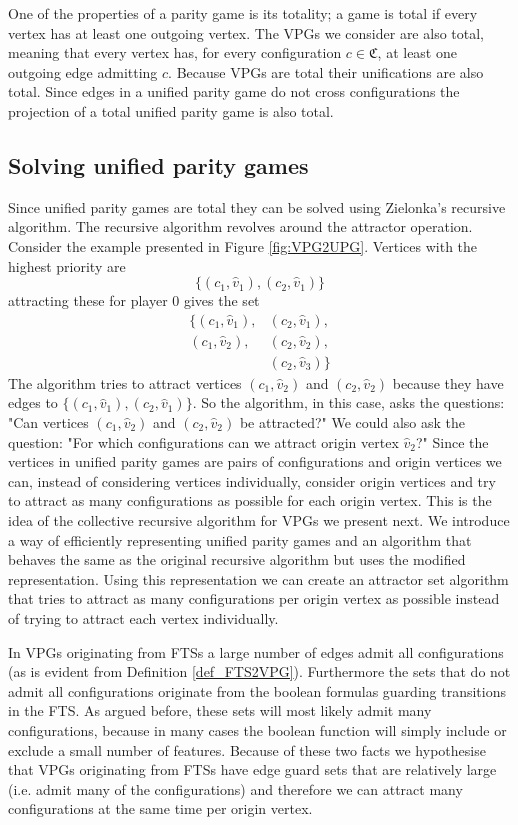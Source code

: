 One of the properties of a parity game is its totality; a game is total if every vertex has at least one outgoing vertex. The VPGs we consider are also total, meaning that every vertex has, for every configuration $c \in \mathfrak{C}$, at least one outgoing edge admitting $c$. Because VPGs are total their unifications are also total. Since edges in a unified parity game do not cross configurations the projection of a total unified parity game is also total.

\subsection{Solving unified parity games}
Since unified parity games are total they can be solved using Zielonka's recursive algorithm. The recursive algorithm revolves around the attractor operation. Consider the example presented in Figure \ref{fig:VPG2UPG}. Vertices with the highest priority are 
\[ \{(c_1,\hat{v}_1),(c_2,\hat{v}_1)\}\]
attracting these for player $0$ gives the set 
\begin{align*}
\{(c_1,\hat{v}_1),&(c_2,\hat{v}_1),\\
(c_1,\hat{v}_2),&(c_2,\hat{v}_2),\\
 &(c_2,\hat{v}_3)\}
\end{align*}
The algorithm tries to attract vertices $(c_1,\hat{v}_2)$ and $(c_2,\hat{v}_2)$ because they have edges to $\{(c_1,\hat{v}_1), (c_2,\hat{v}_1)\}$. So the algorithm, in this case, asks the questions: "Can vertices $(c_1,\hat{v}_2)$ and $(c_2,\hat{v}_2)$ be attracted?" We could also ask the question: "For which configurations can we attract origin vertex $\hat{v}_2$?" Since the vertices in unified parity games are pairs of configurations and origin vertices we can, instead of considering vertices individually, consider origin vertices and try to attract as many configurations as possible for each origin vertex. This is the idea of the collective recursive algorithm for VPGs we present next. We introduce a way of efficiently representing unified parity games and an algorithm that behaves the same as the original recursive algorithm but uses the modified representation. Using this representation we can create an attractor set algorithm that tries to attract as many configurations per origin vertex as possible instead of trying to attract each vertex individually.

In VPGs originating from FTSs a large number of edges admit all configurations (as is evident from Definition \ref{def_FTS2VPG}). Furthermore the sets that do not admit all configurations originate from the boolean formulas guarding transitions in the FTS. As argued before, these sets will most likely admit many configurations, because in many cases the boolean function will simply include or exclude a small number of features. Because of these two facts we hypothesise that VPGs originating from FTSs have edge guard sets that are relatively large (i.e. admit many of the configurations) and therefore we can attract many configurations at the same time per origin vertex.

